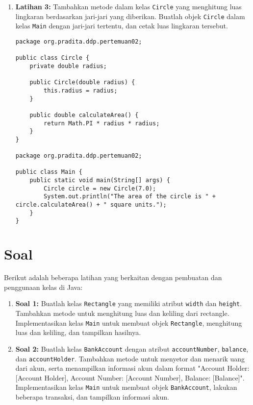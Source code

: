 \begin{enumerate}
\item \textbf{Latihan 3:} Tambahkan metode dalam kelas \texttt{Circle} yang menghitung luas lingkaran berdasarkan jari-jari yang diberikan. Buatlah objek \texttt{Circle} dalam kelas \texttt{Main} dengan jari-jari tertentu, dan cetak luas lingkaran tersebut.

\begin{lstlisting}[style=JavaStyle, caption={Latihan 3}]
package org.pradita.ddp.pertemuan02;

public class Circle {
	private double radius;
	
	public Circle(double radius) {
		this.radius = radius;
	}
	
	public double calculateArea() {
		return Math.PI * radius * radius;
	}
}

package org.pradita.ddp.pertemuan02;

public class Main {
	public static void main(String[] args) {
		Circle circle = new Circle(7.0);
		System.out.println("The area of the circle is " + circle.calculateArea() + " square units.");
	}
}
\end{lstlisting}
\end{enumerate}

\section{Soal}

Berikut adalah beberapa latihan yang berkaitan dengan pembuatan dan penggunaan kelas di Java:

\begin{enumerate}
\item \textbf{Soal 1:} Buatlah kelas \texttt{Rectangle} yang memiliki atribut \texttt{width} dan \texttt{height}. Tambahkan metode untuk menghitung luas dan keliling dari rectangle. Implementasikan kelas \texttt{Main} untuk membuat objek \texttt{Rectangle}, menghitung luas dan keliling, dan tampilkan hasilnya.

\item \textbf{Soal 2:} Buatlah kelas \texttt{BankAccount} dengan atribut \texttt{accountNumber}, \texttt{balance}, dan \texttt{accountHolder}. Tambahkan metode untuk menyetor dan menarik uang dari akun, serta menampilkan informasi akun dalam format "Account Holder: [Account Holder], Account Number: [Account Number], Balance: [Balance]". Implementasikan kelas \texttt{Main} untuk membuat objek \texttt{BankAccount}, lakukan beberapa transaksi, dan tampilkan informasi akun.
\end{enumerate}

